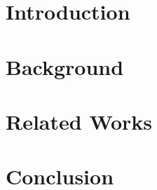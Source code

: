 \documentclass[12pt, onecolumn]{IEEEtran}
\begin{document}
\IEEEpeerreviewmaketitle
\section{Introduction}
\label{ch:intro}

\section{Background}
\label{ch:background}
% 
% 

\section{Related Works}
\label{ch:works}




%


% 

\section{Conclusion}
\label{ch:conclusion}



\end{document}
